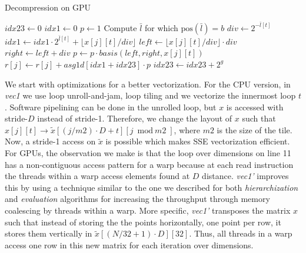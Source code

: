 \begin{algorithm}[b]
\small{
	\caption{Decompression on GPU}
	\label{alg:evaluation}
	\begin{algorithmic}[1]
    		    \State $\textit{idx23} \leftarrow 0$
						\State $\textit{idx1} \leftarrow 0$
						\State $\textit{p} \leftarrow 1$
							\State Compute $\bar{l}$ for which $\text{pos}(\bar{l}) = b$
						\EndIf
							\State $div \leftarrow 2^{-\bar{l}[t]}$
							\State $\textit{idx1} \leftarrow \textit{idx1} \cdot 2^{\bar{l}[t]} + \lfloor	x[j][t] / div \rfloor$
							\State $left \leftarrow \lfloor x[j][t] / div \rfloor \cdot div$
							\State $right \leftarrow left + div$
							\State $p \leftarrow p \cdot basis(left, right, x[j][t])$
						\EndFor
						\State $r[j] \leftarrow r[j] + \textit{asg1d}[\textit{idx1}	+\textit{idx23}] \cdot p$ 
						\State $\textit{idx23} \leftarrow \textit{idx23} + 2^g$
					\EndFor
				\EndFor
    		\EndFor
    	\EndProcedure
 	\end{algorithmic}
}
\end{algorithm}

We start with optimizations for a better vectorization. For the CPU version,
in \textit{vec1} we use loop unroll-and-jam, loop tiling and we vectorize the
innermost loop $t$. Software pipelining can be done in the unrolled loop, but
$x$ is accessed with stride-$D$ instead of stride-1. Therefore, we change the
layout of $x$ such that $x[j][t] \rightarrow \tilde{x}[(j/\textit{m2}) \cdot D +
t][j \bmod \textit{m2}]$, where $\textit{m2}$ is the size of the tile. Now, a
stride-1 access on $\tilde{x}$ is possible which makes SSE vectorization
efficient. For GPUs, the observation we make is that the loop over dimensions on
line 11 has a non-contiguous access pattern for a warp because at each read
instruction the threads within a warp access elements found at $D$ distance.
\textit{vec1'} improves this by using a technique similar to the one we
described for both \textit{hierarchization} and \textit{evaluation} algorithms
for increasing the throughput through memory coalescing by threads within a
warp. More specific, \textit{vec1'} transposes the matrix $x$ such that instead
of storing the the points horizontally, one point per row, it stores them
vertically in $\tilde{x}[(N/32+1) \cdot D][32]$. Thus, all threads in a warp
access one row in this new matrix for each iteration over dimensions.

